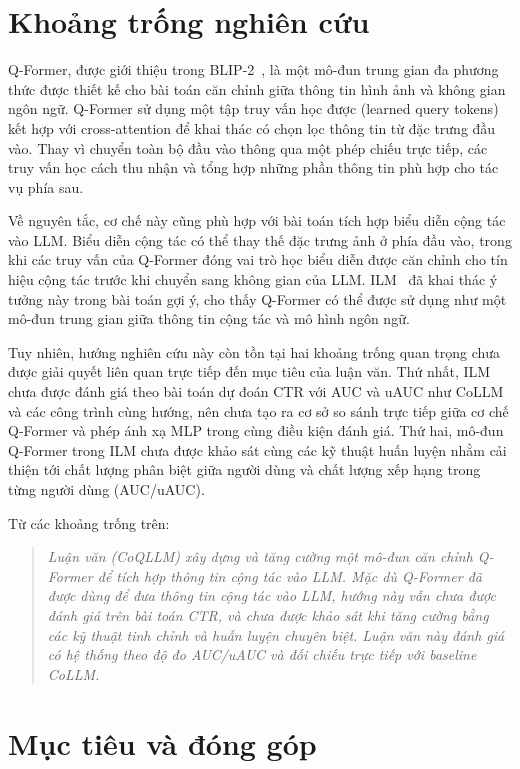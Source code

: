 \section{Khoảng trống nghiên cứu}
\label{sec:khoang-trong}

Q-Former, được giới thiệu trong BLIP-2~\cite{blip2_2023}, là một mô-đun trung gian đa phương thức
được thiết kế cho bài toán căn chỉnh giữa thông tin hình ảnh và không gian ngôn ngữ. Q-Former 
sử dụng một tập truy vấn học được (learned query tokens) kết hợp với cross-attention để khai thác có chọn lọc thông
tin từ đặc trưng đầu vào. Thay vì chuyển toàn bộ đầu vào thông qua một phép chiếu trực tiếp,
các truy vấn học cách thu nhận và tổng hợp những phần thông tin phù hợp cho tác vụ phía
sau.

Về nguyên tắc, cơ chế này cũng phù hợp với bài toán tích hợp biểu diễn cộng tác vào LLM.
Biểu diễn cộng tác có thể thay thế đặc trưng ảnh ở phía đầu vào, trong khi các truy vấn của
Q-Former đóng vai trò học biểu diễn được căn chỉnh cho tín hiệu cộng tác trước khi chuyển sang không gian của
LLM. ILM~\cite{ilm2024} đã khai thác ý tưởng này trong bài toán gợi ý, cho thấy Q-Former
có thể được sử dụng như một mô-đun trung gian giữa thông tin cộng tác và mô hình ngôn ngữ.

Tuy nhiên, hướng nghiên cứu này còn tồn tại hai khoảng trống quan trọng chưa được giải
quyết liên quan trực tiếp đến mục tiêu của luận văn. Thứ nhất,
ILM chưa được đánh giá theo bài toán dự đoán CTR với AUC và uAUC như CoLLM và các
công trình cùng hướng, nên chưa tạo ra cơ sở so sánh trực tiếp giữa cơ chế Q-Former và phép
ánh xạ MLP trong cùng điều kiện đánh giá. Thứ hai, mô-đun Q-Former trong ILM chưa được
khảo sát cùng các kỹ thuật huấn luyện nhằm cải thiện tới chất lượng phân biệt giữa người dùng
và chất lượng xếp hạng trong từng người dùng (AUC/uAUC).

Từ các khoảng trống trên:

\begin{quote}
\textit{Luận văn (CoQLLM) xây dựng và tăng cường một mô-đun căn chỉnh Q-Former 
để tích hợp thông tin cộng tác vào LLM. Mặc dù Q-Former đã được dùng để đưa
thông tin cộng tác vào LLM, hướng này vẫn chưa được đánh giá trên bài toán CTR, và chưa được
khảo sát khi tăng cường bằng các kỹ thuật tinh chỉnh và huấn luyện chuyên biệt. 
Luận văn này đánh giá có hệ thống theo độ đo AUC/uAUC và đối chiếu trực tiếp với baseline CoLLM.}
\end{quote}

\section{Mục tiêu và đóng góp}
\label{sec:dong-gop}

